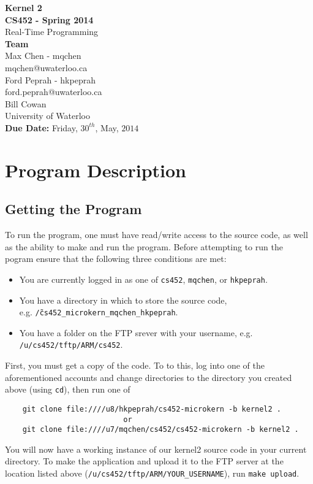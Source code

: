 \documentclass[12pt]{article}
\begin{document}
\thispagestyle{empty}
\begin{center}
  {\bf\Large Kernel 2}\\
  {\bf\large CS452 - Spring 2014}\\
  Real-Time Programming\vspace{5cm}\\
  {\bf Team }\\
  Max Chen - mqchen\\
  mqchen@uwaterloo.ca\\[1\baselineskip]
  Ford Peprah - hkpeprah\\
  ford.peprah@uwaterloo.ca\vspace{5cm}\\
  Bill Cowan\\
  University of Waterloo\\
  {\bf Due Date:} Friday, $30^{th}$, May, $2014$
\end{center}
\newpage
\thispagestyle{empty}
\tableofcontents
\newpage
\section{Program Description}
\subsection{Getting the Program}
To run the program, one must have read/write access to the source code, as well as the ability to make and run the program.  Before attempting to run the pogram ensure that the following three conditions are met:
\begin{itemize}
  \item You are currently logged in as one of \texttt{cs452}, \texttt{mqchen}, or \texttt{hkpeprah}.
  \item You have a directory in which to store the source code, \\ e.g. \texttt{\~/cs452\_microkern\_mqchen\_hkpeprah}.
  \item You have a folder on the FTP srever with your username, e.g. \texttt{/u/cs452/tftp/ARM/cs452}.
\end{itemize}
First, you must get a copy of the code.  To to this, log into one of the aforementioned accounts and change directories to the directory you created above (using \texttt{cd}), then run one of
\begin{center}
  \begin{verbatim}
    git clone file:////u8/hkpeprah/cs452-microkern -b kernel2 .
                           or
    git clone file:////u7/mqchen/cs452/cs452-microkern -b kernel2 .
  \end{verbatim}
\end{center}
\vspace{-0.5cm}You will now have a working instance of our kernel2 source code in your current directory.  To make the application and upload it to the FTP server at the location listed above (\texttt{/u/cs452/tftp/ARM/YOUR\_USERNAME}), run \texttt{make upload}.
\\[1\baselineskip]
\end{document}
